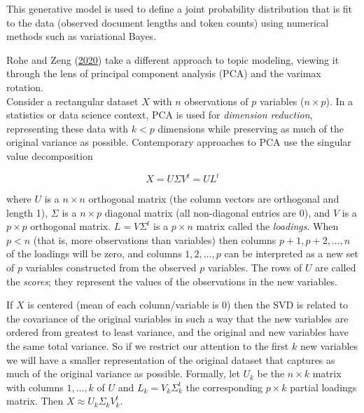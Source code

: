 \documentclass[
]{article}
\begin{document}
This generative model is used to define a joint probability distribution
that is fit to the data (observed document lengths and token counts)
using numerical methods such as variational Bayes.

Rohe and Zeng
(\protect\hyperlink{ref-RoheVintageFactorAnalysis2020}{2020}) take a
different approach to topic modeling, viewing it through the lens of
principal component analysis (PCA) and the varimax rotation.\\
Consider a rectangular dataset \(X\) with \(n\) observations of \(p\)
variables (\(n \times p\)). In a statistics or data science context, PCA
is used for \emph{dimension reduction}, representing these data with
\(k < p\) dimensions while preserving as much of the original variance
as possible. Contemporary approaches to PCA use the singular value
decomposition

\[ X = U \Sigma V^t = U L^t \]

where \(U\) is a \(n \times n\) orthogonal matrix (the column vectors
are orthogonal and length 1), \(\Sigma\) is a \(n \times p\) diagonal
matrix (all non-diagonal entries are 0), and \(V\) is a \(p \times p\)
orthogonal matrix. \(L = V \Sigma^t\) is a \(p \times n\) matrix called
the \emph{loadings}. When \(p < n\) (that is, more observations than
variables) then columns \(p+1, p+2, \ldots, n\) of the loadings will be
zero, and columns \(1, 2, \ldots, p\) can be interpreted as a new set of
\(p\) variables constructed from the observed \(p\) variables. The rows
of \(U\) are called the \emph{scores}; they represent the values of the
observations in the new variables.

If \(X\) is centered (mean of each column/variable is 0) then the SVD is
related to the covariance of the original variables in such a way that
the new variables are ordered from greatest to least variance, and the
original and new variables have the same total variance. So if we
restrict our attention to the first \(k\) new variables we will have a
smaller representation of the original dataset that captures as much of
the original variance as possible. Formally, let \(U_k\) be the
\(n \times k\) matrix with columns \(1, \ldots, k\) of \(U\) and
\(L_k = V_k \Sigma_k^t\) the corresponding \(p \times k\) partial
loadings matrix. Then \(X \approx U_k \Sigma_k V_k^t\).
\end{document}
